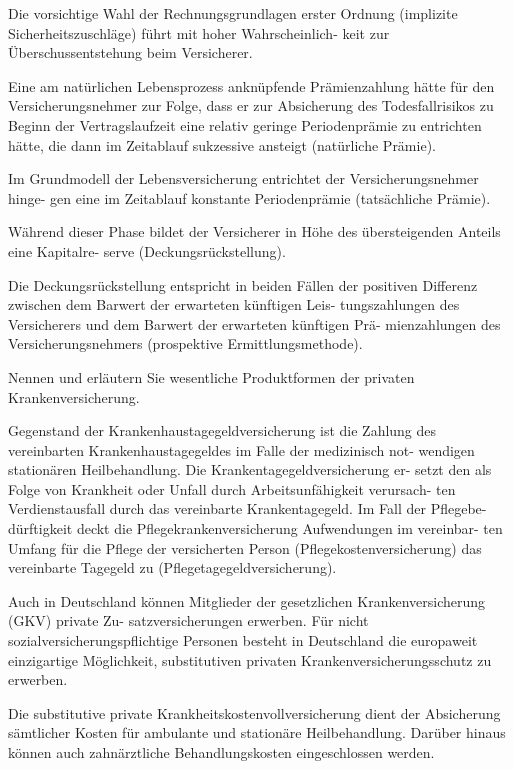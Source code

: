 Die vorsichtige Wahl der Rechnungsgrundlagen
erster Ordnung (implizite Sicherheitszuschläge) führt mit hoher Wahrscheinlich-
keit zur Überschussentstehung beim Versicherer.


Eine am natürlichen Lebensprozess anknüpfende Prämienzahlung hätte für den
Versicherungsnehmer zur Folge, dass er zur Absicherung des Todesfallrisikos zu
Beginn der Vertragslaufzeit eine relativ geringe Periodenprämie zu entrichten
hätte, die dann im Zeitablauf sukzessive ansteigt (natürliche Prämie).

Im Grundmodell der Lebensversicherung entrichtet der Versicherungsnehmer hinge-
gen eine im Zeitablauf konstante Periodenprämie (tatsächliche Prämie).

Während dieser Phase bildet der Versicherer in Höhe des übersteigenden Anteils eine Kapitalre-
serve (Deckungsrückstellung).

Die Deckungsrückstellung entspricht in beiden
Fällen der positiven Differenz zwischen dem Barwert der erwarteten künftigen Leis-
tungszahlungen des Versicherers und dem Barwert der erwarteten künftigen Prä-
mienzahlungen des Versicherungsnehmers (prospektive Ermittlungsmethode).




Nennen und erläutern Sie wesentliche Produktformen der privaten
Krankenversicherung.


Gegenstand der Krankenhaustagegeldversicherung ist die
Zahlung des vereinbarten Krankenhaustagegeldes im Falle der medizinisch not-
wendigen stationären Heilbehandlung. Die Krankentagegeldversicherung er-
setzt den als Folge von Krankheit oder Unfall durch Arbeitsunfähigkeit verursach-
ten Verdienstausfall durch das vereinbarte Krankentagegeld. Im Fall der Pflegebe-
dürftigkeit deckt die Pflegekrankenversicherung Aufwendungen im vereinbar-
ten Umfang für die Pflege der versicherten Person (Pflegekostenversicherung) das
vereinbarte Tagegeld zu (Pflegetagegeldversicherung).

Auch in Deutschland können Mitglieder der gesetzlichen Krankenversicherung (GKV) private Zu-
satzversicherungen erwerben. Für nicht sozialversicherungspflichtige Personen
besteht in Deutschland die europaweit einzigartige Möglichkeit, substitutiven privaten 
Krankenversicherungsschutz zu erwerben.

Die substitutive private Krankheitskostenvollversicherung dient der Absicherung sämtlicher Kosten für 
ambulante und stationäre Heilbehandlung. Darüber hinaus können auch zahnärztliche Behandlungskosten eingeschlossen werden.

